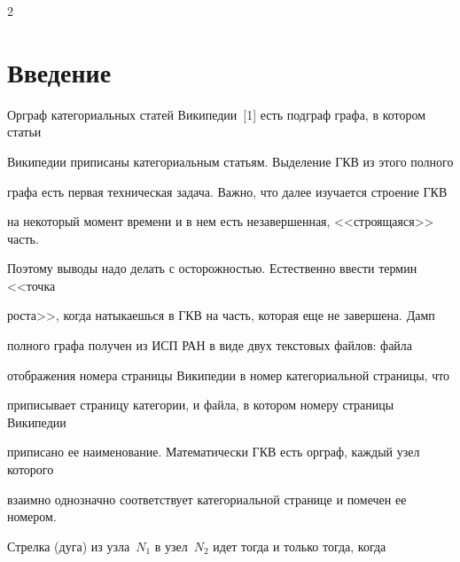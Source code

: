 \vspace*{4pt}






\vspace*{4pt}








      \thispagestyle{headings}



      \begin{multicols}{2}



            \label{st\stat}

            

\section{Введение}



Орграф категориальных статей Википедии~[1] есть подграф графа, в котором статьи 

Википедии приписаны категориальным статьям. Выделение ГКВ из этого полного 

графа есть первая техническая задача. Важно, что далее изучается строение ГКВ 

на некоторый момент времени и в нем есть незавершенная, <<строящаяся>> часть. 

Поэтому выводы надо делать с осторожностью. Естественно ввести термин <<точка 

роста>>, когда натыкаешься в ГКВ на часть, которая еще не завершена. Дамп 

полного графа получен из ИСП РАН в виде двух текстовых файлов: файла 

отображения номера страницы Википедии в номер категориальной страницы, что 

приписывает страницу категории, и файла, в котором номеру страницы Википедии 

приписано ее наименование. Математически ГКВ есть орграф, каждый узел которого 

взаимно однозначно соответствует категориальной странице и помечен ее номером. 

Стрелка (дуга) из узла~$N_1$ в узел~$N_2$ идет тогда и только тогда, когда 


\end{multicols}
